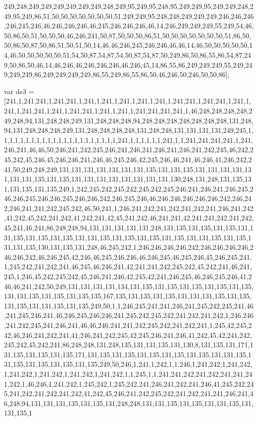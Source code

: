 249,248,249,249,249,249,249,249,248,249,95,249,95,248,95,249,249,95,249,249,248,249,95,249,86,51,50,50,50,50,50,50,50,51,249,249,95,248,248,249,249,249,246,246,246,246,245,246,46,246,246,246,46,245,246,246,246,46,14,246,249,249,249,55,249,54,46,50,86,50,51,50,50,50,46,246,241,50,87,50,50,50,86,51,50,50,50,50,50,50,50,51,86,50,50,86,50,87,50,86,51,50,51,50,14,46,46,246,245,246,246,46,46,14,46,50,50,50,50,50,14,46,50,50,50,50,50,51,54,50,87,54,87,54,50,87,54,87,50,249,86,50,86,55,86,54,87,249,50,86,50,46,14,46,246,46,246,246,246,46,246,45,14,86,55,86,249,249,249,55,249,249,249,249,86,249,249,249,249,86,55,249,86,55,86,50,46,246,50,246,50,50,86];

var de3 = [241,1,241,241,1,241,241,1,241,1,241,1,241,1,241,1,241,1,241,241,1,241,241,1,241,1,241,1,241,241,1,241,1,241,241,1,241,1,241,1,241,241,241,241,1,46,248,248,248,248,249,248,94,131,248,248,249,131,248,248,248,94,248,248,248,248,248,248,248,131,248,94,131,248,248,248,249,131,248,248,248,248,131,248,248,131,131,131,131,249,245,1,1,1,1,1,1,1,1,1,1,1,1,1,1,1,1,1,1,1,1,1,1,241,1,1,1,1,1,1,241,1,1,241,241,241,241,1,241,246,241,46,46,50,246,241,242,245,246,241,246,241,246,241,246,241,242,245,46,242,245,242,45,246,45,246,246,241,246,46,245,246,42,245,246,46,241,46,246,41,246,242,241,50,249,248,249,131,131,131,131,131,131,131,135,131,131,135,131,131,131,131,131,131,131,135,131,135,131,131,131,131,131,131,131,131,130,248,131,248,131,135,131,131,135,131,135,249,1,242,245,242,245,242,245,242,245,246,241,246,241,246,245,246,246,245,246,246,245,246,246,242,246,245,246,46,246,246,246,246,246,242,246,242,246,241,241,242,245,242,46,50,241,1,246,241,242,241,242,241,242,241,246,241,242,41,242,45,242,241,242,41,242,241,42,45,241,242,46,241,241,42,241,241,242,241,242,45,241,46,241,86,248,248,94,131,131,131,131,131,248,131,135,131,135,131,135,131,131,135,131,135,131,135,131,131,135,131,135,131,135,131,135,131,131,135,131,135,131,131,135,130,131,135,131,248,46,245,242,1,246,246,246,246,242,246,246,246,246,246,246,242,46,246,245,42,246,46,245,246,246,46,246,245,46,245,246,45,246,245,241,1,245,242,241,242,241,46,245,46,246,241,42,241,241,242,245,242,45,242,241,46,241,245,1,246,45,242,245,242,45,246,241,246,42,245,42,241,246,245,46,246,245,246,41,246,46,241,242,50,249,131,131,131,131,134,131,135,131,135,131,135,131,135,131,135,131,131,135,131,135,131,135,135,167,135,131,135,131,135,131,131,131,135,131,135,131,135,131,131,135,131,135,249,50,1,1,246,245,241,241,246,241,245,242,245,241,46,241,245,246,241,46,246,245,246,246,241,245,242,245,242,241,242,241,242,1,246,246,241,242,245,241,246,241,46,46,246,241,241,242,245,242,241,242,241,1,245,42,245,242,46,246,241,242,241,41,246,241,242,245,42,245,246,241,246,41,242,45,42,241,242,245,242,45,242,241,86,248,248,131,248,135,131,131,135,131,130,8,131,135,131,171,131,135,131,135,131,135,171,131,135,131,135,131,135,131,135,131,135,131,131,135,131,135,131,135,131,135,131,135,249,50,246,1,241,1,242,1,1,246,1,241,242,1,241,242,1,241,242,1,241,242,1,241,242,1,241,242,1,1,245,1,1,241,241,242,241,242,241,241,241,242,1,46,246,1,241,242,1,245,242,1,245,242,241,246,241,242,241,246,41,245,242,245,241,242,241,242,241,242,41,242,45,246,241,242,245,242,241,242,241,241,246,241,46,248,94,131,131,131,135,131,135,131,248,248,131,131,135,131,135,131,131,135,131,131,135,1